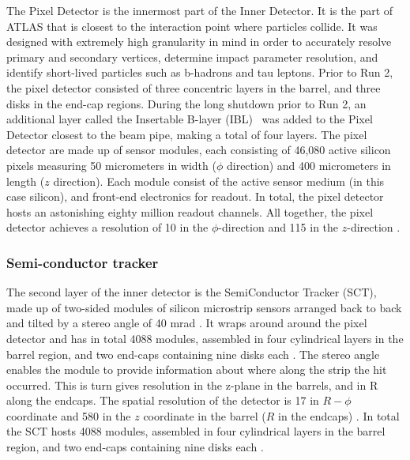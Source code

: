 The Pixel Detector is the innermost part of the Inner Detector. It is the part of ATLAS that is closest to the interaction point where particles collide. It was designed with extremely high granularity in mind in order to accurately resolve primary and secondary vertices, determine impact parameter resolution, and identify short-lived particles such as b-hadrons and tau leptons. Prior to Run 2, the pixel detector consisted of three concentric layers in the barrel, and three disks in the end-cap regions. During the long shutdown prior to Run 2, an additional layer called the Insertable B-layer (IBL)~\cite{Capeans:1291633} was added to the Pixel Detector closest to the beam pipe, making a total of four layers. The pixel detector are made up of sensor modules, each consisting of 46,080 active silicon pixels measuring 50 micrometers in width ($\phi$ direction) and 400 micrometers in length ($z$ direction). Each module consist of the active sensor medium (in this case silicon), and front-end electronics for readout. In total, the pixel detector hosts an astonishing eighty million readout channels. All together, the pixel detector achieves a resolution of \unit{10}{\micro\meter} in the $\phi$-direction and \unit{115}{\micro\meter} in the $z$-direction .

\subsubsection{Semi-conductor tracker}

The second layer of the inner detector is the SemiConductor Tracker (SCT), made up of two-sided modules of silicon microstrip sensors arranged back to back and tilted by a stereo angle of 40 mrad \cite{AHMAD200798}. It wraps around around the pixel detector and has in total 4088 modules, assembled in four cylindrical layers in the barrel region, and two end-caps containing nine disks each \cite{CERN-LHCC-2017-005}. The stereo angle enables the module to provide information about where along the strip the hit occurred. This is turn gives resolution in the z-plane in the barrels, and in R along the endcaps. The spatial resolution of the detector is \unit{17}{\mu\meter} in $R-\phi$ coordinate and \unit{580}{\mu\meter} in the $z$ coordinate in the barrel ($R$ in the endcaps) \cite{Abdesselam:974073}. In total the SCT hosts 4088 modules, assembled in four cylindrical layers in the barrel region, and two end-caps containing nine disks each \cite{CERN-LHCC-2017-005}. 

